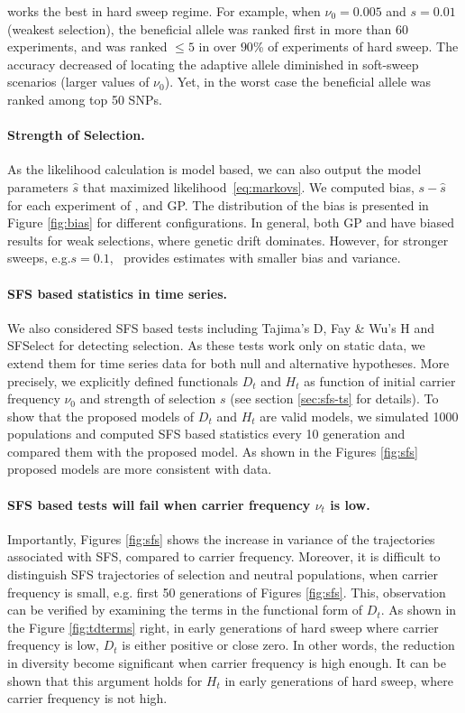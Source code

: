 \documentclass[11pt]{article}
\def\comale{\text{COMALE }}
\begin{document}
\comale works the best in hard sweep regime. For example, when
$\nu_0=0.005$ and $s=0.01$ (weakest selection), the beneficial allele
was ranked first in more than 60 experiments, and was ranked $\le 5$
in over $90$\% of experiments of hard sweep. The accuracy decreased of
locating the adaptive allele diminished in soft-sweep scenarios
(larger values of $\nu_0$). Yet, in the worst case the beneficial
allele was ranked among top 50 SNPs.

\paragraph{Strength of Selection.}
As the likelihood calculation is model based, we can also output the
model parameters $\hat{s}$ that maximized
likelihood~\eqref{eq:markovs}.  We computed bias, $s-\hat{s}$ for each
experiment of \comale, and GP. The distribution of the bias is
presented in Figure \ref{fig:bias} for different configurations. In
general, both GP and \comale have biased results for weak selections,
where genetic drift dominates. However, for stronger sweeps,
e.g.$s=0.1$, \comale\ provides estimates with smaller bias and
variance.


\paragraph{SFS based statistics in time series.} 
We also considered SFS based tests including Tajima's D, Fay \& Wu's H and 
SFSelect for detecting selection. 
As these tests work only on static data, we extend them for time series data 
for both null and alternative hypotheses.
More precisely, we explicitly defined functionals $D_t$ and $H_t$ as function 
of initial carrier frequency $\nu_0$ and strength of selection $s$ (see section 
\ref{sec:sfs-ts} for details).
 To show that the proposed models of $D_t$ and $H_t$ are valid models, we 
 simulated 1000 populations and computed SFS based statistics every 10 
 generation and compared them with the proposed model.
 As shown in the Figures \ref{fig:sfs} proposed models are more consistent with data.

\paragraph{SFS based tests will fail when carrier frequency $\nu_t$ is low.}
Importantly,  Figures \ref{fig:sfs} shows the increase in variance of the trajectories associated with SFS, compared to carrier frequency. Moreover, it is difficult to distinguish SFS trajectories of selection and neutral populations, when carrier frequency is small, e.g. first 50 generations of Figures \ref{fig:sfs}.
This, observation can be verified by examining the terms in the functional form of $D_t$.
As shown in the Figure 
\ref{fig:tdterms} right, in early 
generations of hard sweep where carrier frequency is low, 
$D_t$ is either 
positive or close zero. In other words, the reduction in 
diversity become 
significant when carrier frequency is high enough.
It can be shown that this argument holds for $H_t$ in early generations 
of hard sweep, where carrier frequency is not high.
\end{document}
